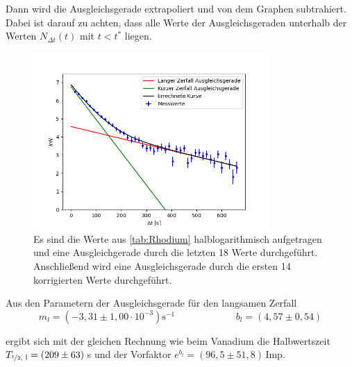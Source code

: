         Dann wird die Ausgleichsgerade extrapoliert und von dem Graphen subtrahiert. Dabei ist darauf zu achten, dass alle Werte der Ausgleichsgeraden unterhalb der Werten $N_{\Delta t}(t)$ mit $t < t^*$ liegen.
        \begin{figure}[h]
            \centering
            \includegraphics[width = 0.8\textwidth]{pictures/HalbwertszeitGraph_Rhodium.png}
            \caption{Es sind die Werte aus \autoref{tab:Rhodium} halblogarithmisch aufgetragen und eine Ausgleichgerade durch die letzten 18 Werte durchgeführt. Anschließend wird eine Ausgleichsgerade durch die ersten 14 korrigierten Werte durchgeführt.}
            \label{fig:Rhodium}
        \end{figure}

        \FloatBarrier
        
        Aus den Parametern der Ausgleichsgerade für den langsamen Zerfall
        \begin{equation*}
            m_l = (-3,31 \pm 1,00 \cdot 10^{-3}) \text{s}^{-1} \hspace{75pt} b_l = (4,57 \pm 0,54)
        \end{equation*}

        ergibt sich mit der gleichen Rechnung wie beim Vanadium die Halbwertszeit $T_{\nicefrac{1}{2} \text{, l}} = (209 \pm 63) \,$s und der Vorfaktor $e^{b_l} = (96,5 \pm 51,8) \,$Imp. \\

